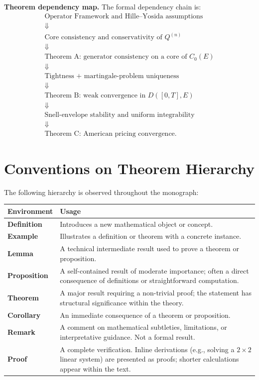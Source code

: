 \documentclass[11pt,a4paper,openany]{book}
\theoremstyle{definition}
\theoremstyle{plain}
\theoremstyle{remark}
\newcommand{\1}{\mathbbm{1}}
\begin{document}
\medskip
\noindent\textbf{Theorem dependency map.} The formal dependency chain is:
\[
\begin{array}{c}
\text{Operator Framework and Hille--Yosida assumptions} \\
\Downarrow \\
\text{Core consistency and conservativity of } Q^{(n)} \\
\Downarrow \\
\text{Theorem A: generator consistency on a core of } C_0(E) \\
\Downarrow \\
\text{Tightness + martingale-problem uniqueness} \\
\Downarrow \\
\text{Theorem B: weak convergence in } D([0,T],E) \\
\Downarrow \\
\text{Snell-envelope stability and uniform integrability} \\
\Downarrow \\
\text{Theorem C: American pricing convergence.}
\end{array}
\]

\section{Conventions on Theorem Hierarchy}

The following hierarchy is observed throughout the monograph:

\begin{center}
\begin{tabular}{>{\raggedright\arraybackslash}p{2.5cm}>{\raggedright\arraybackslash}p{9cm}}
\toprule
\textbf{Environment} & \textbf{Usage} \\
\midrule
\textbf{Definition} & Introduces a new mathematical object or concept. \\
\textbf{Example} & Illustrates a definition or theorem with a concrete instance. \\
\textbf{Lemma} & A technical intermediate result used to prove a theorem or proposition. \\
\textbf{Proposition} & A self-contained result of moderate importance; often a direct consequence of definitions or straightforward computation. \\
\textbf{Theorem} & A major result requiring a non-trivial proof; the statement has structural significance within the theory. \\
\textbf{Corollary} & An immediate consequence of a theorem or proposition. \\
\textbf{Remark} & A comment on mathematical subtleties, limitations, or interpretative guidance. Not a formal result. \\
\textbf{Proof} & A complete verification. Inline derivations (e.g., solving a $2 \times 2$ linear system) are presented as proofs; shorter calculations appear within the text. \\
\bottomrule
\end{tabular}
\end{center}
\end{document}
